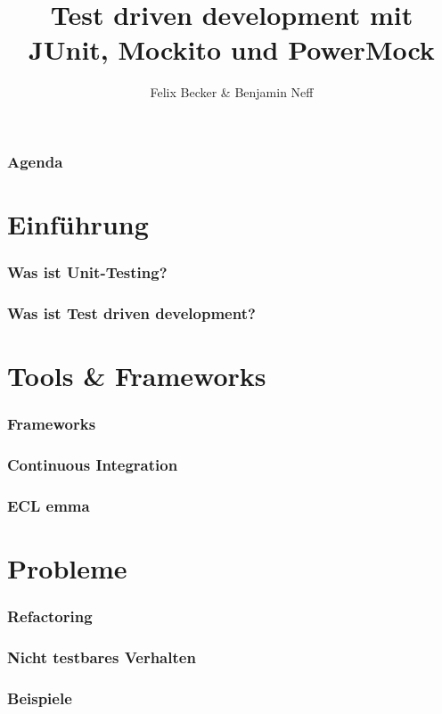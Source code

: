 \documentclass{beamer}
\title{Test driven development mit JUnit, Mockito und PowerMock}
\institute{Computerseminar Tondorf 2011}
\author[F. Becker, B. Neff]{
        Felix Becker \& 
	Benjamin Neff
}
\begin{document}
	\begin{frame}
	\begin{frame}
		\titlepage
	\end{frame}

	\begin{frame}
		\frametitle{Agenda}
		\setcounter{tocdepth}{1}
		\tableofcontents
	\end{frame}
	

	\section{Einführung}
	
		\begin{frame}
			\frametitle{Was ist Unit-Testing?}
		\end{frame}

		\begin{frame}
			\frametitle{Was ist Test driven development?}
		\end{frame}

	
	\section{Tools \& Frameworks}
		\begin{frame}
			\frametitle{Frameworks}
		\end{frame}

		\begin{frame}
			\frametitle{Continuous Integration}
		\end{frame}

		\begin{frame}
			\frametitle{ECL emma}
		\end{frame}

	
	\section{Probleme}
		\begin{frame}
			\frametitle{Refactoring}
		\end{frame}

		\begin{frame}
			\frametitle{Nicht testbares Verhalten}
		\end{frame}

		\begin{frame}
			\frametitle{Beispiele}
		\end{frame}


\end{frame}
\end{document}

